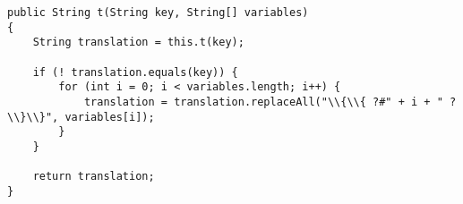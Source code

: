 \begin{lstlisting}
public String t(String key, String[] variables)
{
    String translation = this.t(key);

    if (! translation.equals(key)) {
        for (int i = 0; i < variables.length; i++) {
            translation = translation.replaceAll("\\{\\{ ?#" + i + " ?\\}\\}", variables[i]);
        }
    }

    return translation;
}
\end{lstlisting}
\vspace{2ex}